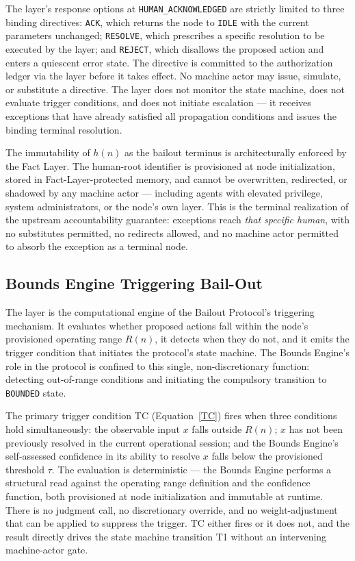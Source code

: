 The \purpose{} layer's response options at \texttt{HUMAN\_ACKNOWLEDGED} are strictly limited to three binding directives: \texttt{ACK}, which returns the node to \texttt{IDLE} with the current parameters unchanged; \texttt{RESOLVE}, which prescribes a specific resolution to be executed by the \fact{} layer; and \texttt{REJECT}, which disallows the proposed action and enters a quiescent error state. The directive is committed to the authorization ledger via the \fact{} layer before it takes effect. No machine actor may issue, simulate, or substitute a directive. The \purpose{} layer does not monitor the state machine, does not evaluate trigger conditions, and does not initiate escalation — it receives exceptions that have already satisfied all propagation conditions and issues the binding terminal resolution.

The immutability of $h(n)$ as the bailout terminus is architecturally enforced by the Fact Layer. The human-root identifier is provisioned at node initialization, stored in Fact-Layer-protected memory, and cannot be overwritten, redirected, or shadowed by any machine actor — including agents with elevated privilege, system administrators, or the node's own \bounds{} layer. This is the terminal realization of the upstream accountability guarantee: exceptions reach \emph{that specific human}, with no substitutes permitted, no redirects allowed, and no machine actor permitted to absorb the exception as a terminal node.

\subsection{Bounds Engine Triggering Bail-Out}
\label{sec:bailout-bounds-trigger}

The \bounds{} layer is the computational engine of the Bailout Protocol's triggering mechanism. It evaluates whether proposed actions fall within the node's provisioned operating range $R(n)$, it detects when they do not, and it emits the trigger condition that initiates the protocol's state machine. The Bounds Engine's role in the protocol is confined to this single, non-discretionary function: detecting out-of-range conditions and initiating the compulsory transition to \texttt{BOUNDED} state.

The primary trigger condition TC (Equation~\ref{TC}) fires when three conditions hold simultaneously: the observable input $x$ falls outside $R(n)$; $x$ has not been previously resolved in the current operational session; and the Bounds Engine's self-assessed confidence in its ability to resolve $x$ falls below the provisioned threshold $\tau$. The evaluation is deterministic — the Bounds Engine performs a structural read against the operating range definition and the confidence function, both provisioned at node initialization and immutable at runtime. There is no judgment call, no discretionary override, and no weight-adjustment that can be applied to suppress the trigger. TC either fires or it does not, and the result directly drives the state machine transition T1 without an intervening machine-actor gate.

